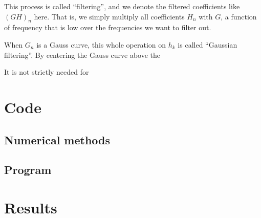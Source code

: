 \documentclass[12pt,a4paper]{article}
\begin{document}
This process is called ``filtering'', and we denote the
filtered coefficients like $(GH)_n$ here.%
That is, we simply multiply all coefficients $H_n$ with
$G$, a function of frequency that is low over the
frequencies we want to filter out.

When $G_n$ is a Gauss curve, this whole operation on $h_k$ is called ``Gaussian filtering''.
By centering the Gauss curve above the 

It is not strictly needed for 



\section{Code}\label{sec:code}

\subsection{Numerical methods}\label{sec:nm}

\subsection{Program}

\section{Results}\label{sec:results}
\end{document}

